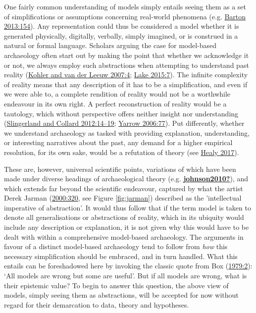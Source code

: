 \documentclass[
  12pt,
  a4paper,
  oneside]{book}
\begin{document}
One fairly common understanding of models simply entails seeing them as a set of simplifications or assumptions concerning real-world phenomena (e.g. \protect\hyperlink{ref-barton2013}{Barton 2013:154}). Any representation could thus be considered a model whether it is generated physically, digitally, verbally, simply imagined, or is construed in a natural or formal language. Scholars arguing the case for model-based archaeology often start out by making the point that whether we acknowledge it or not, we always employ such abstractions when attempting to understand past reality (\protect\hyperlink{ref-kohler2007}{Kohler and van der Leeuw 2007:4}; \protect\hyperlink{ref-lake2015}{Lake 2015:7}). The infinite complexity of reality means that any description of it has to be a simplification, and even if we were able to, a complete rendition of reality would not be a worthwhile endeavour in its own right. A perfect reconstruction of reality would be a tautology, which without perspective offers neither insight nor understanding (\protect\hyperlink{ref-slingerland2012}{Slingerland and Collard 2012:14--19}; \protect\hyperlink{ref-yarrow2006}{Yarrow 2006:77}). Put differently, whether we understand archaeology as tasked with providing explanation, understanding, or interesting narratives about the past, any demand for a higher empirical resolution, for its own sake, would be a refutation of theory (see \protect\hyperlink{ref-healy2017}{Healy 2017}).

These are, however, universal scientific points, variations of which have been made under diverse headings of archaeological theory (e.g. \protect\hyperlink{ref-johnson2010}{\textbf{johnson2010?}}), and which extends far beyond the scientific endeavour, captured by what the artist Derek Jarman (\protect\hyperlink{ref-jarman2000}{2000:320}, see Figure \ref{fig:jarman}) described as the 'intellectual imperative of abstraction'. It would thus follow that if the term model is taken to denote all generalisations or abstractions of reality, which in its ubiquity would include any description or explanation, it is not given why this would have to be dealt with within a comprehensive model-based archaeology. The arguments in favour of a distinct model-based archaeology tend to follow from \emph{how} this necessary simplification should be embraced, and in turn handled. What this entails can be foreshadowed here by invoking the classic quote from Box (\protect\hyperlink{ref-box1979}{1979:2}): `All models are wrong but some are useful'. But if all models are wrong, what is their epistemic value? To begin to answer this question, the above view of models, simply seeing them as abstractions, will be accepted for now without regard for their demarcation to data, theory and hypotheses.
\end{document}
